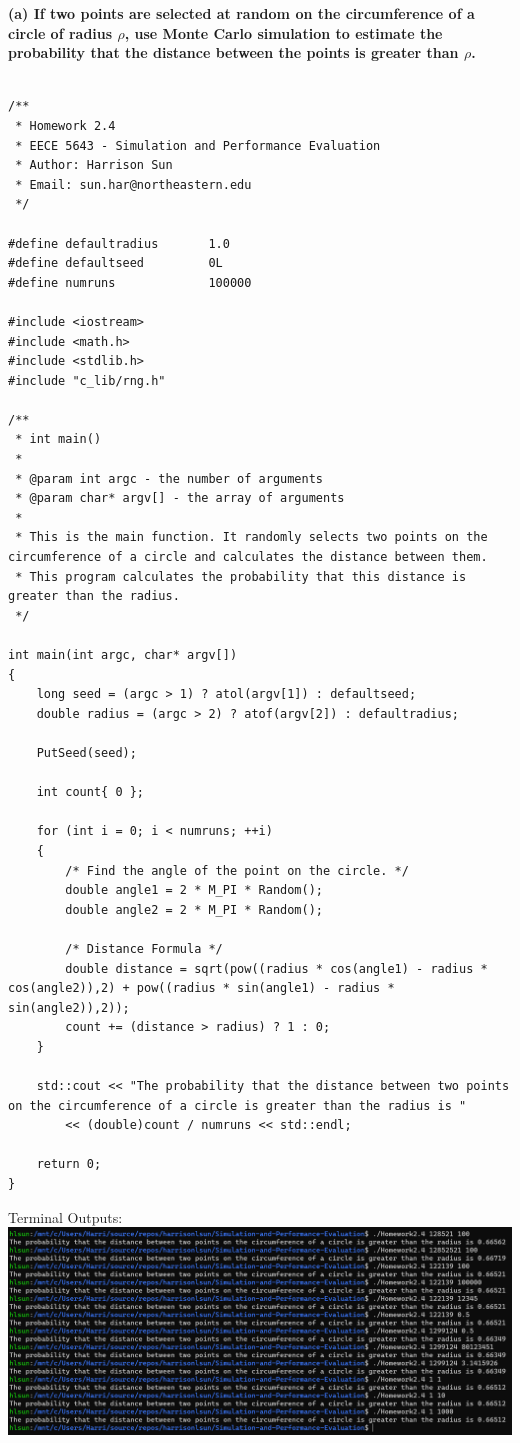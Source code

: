 \textbf{(a) If two points are selected at random on the circumference of a circle of
radius $\rho$, use Monte Carlo simulation to estimate the probability that the distance between the points is greater than $\rho$.\\\\}

\begin{lstlisting}[style=CStyle]
/**
 * Homework 2.4
 * EECE 5643 - Simulation and Performance Evaluation
 * Author: Harrison Sun
 * Email: sun.har@northeastern.edu
 */

#define defaultradius		1.0
#define defaultseed			0L
#define numruns				100000

#include <iostream>
#include <math.h>
#include <stdlib.h>
#include "c_lib/rng.h"

/**
 * int main()
 * 
 * @param int argc - the number of arguments
 * @param char* argv[] - the array of arguments
 * 
 * This is the main function. It randomly selects two points on the circumference of a circle and calculates the distance between them. 
 * This program calculates the probability that this distance is greater than the radius.
 */

int main(int argc, char* argv[])
{
	long seed = (argc > 1) ? atol(argv[1]) : defaultseed;
	double radius = (argc > 2) ? atof(argv[2]) : defaultradius;

	PutSeed(seed);
	
	int count{ 0 };
	
	for (int i = 0; i < numruns; ++i)
	{
		/* Find the angle of the point on the circle. */
		double angle1 = 2 * M_PI * Random();
		double angle2 = 2 * M_PI * Random();
		
		/* Distance Formula */
		double distance = sqrt(pow((radius * cos(angle1) - radius * cos(angle2)),2) + pow((radius * sin(angle1) - radius * sin(angle2)),2));
		count += (distance > radius) ? 1 : 0;
	}
	
	std::cout << "The probability that the distance between two points on the circumference of a circle is greater than the radius is "
		<< (double)count / numruns << std::endl;
	
	return 0;
}
\end{lstlisting}
\newpage \noindent
Terminal Outputs:\\
\includegraphics[scale=0.5]{Sections/H2_4.png}\\\\\\
